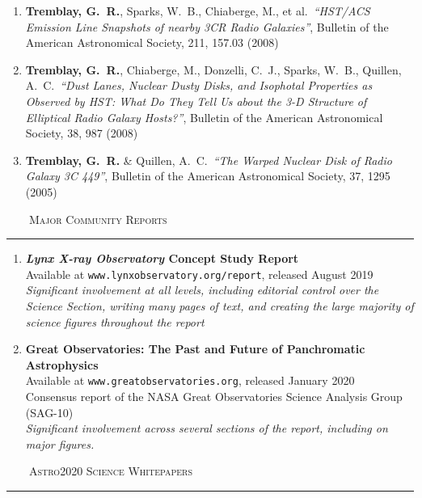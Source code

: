 \documentclass[11pt]{article}
\makeatletter
\def\vhrulefill#1{\leavevmode\leaders\hrule\@height#1\hfill \kern\z@}
\makeatother
\begin{document}
\begin{enumerate}
\item \textbf{Tremblay, G.~R.}, Sparks, W.~B., Chiaberge, M., et al.\ \textit{``HST/ACS Emission Line Snapshots of nearby 3CR Radio Galaxies''},
Bulletin of the American Astronomical Society, 211, 157.03 (2008)



\item \textbf{Tremblay, G.~R.}, Chiaberge, M., Donzelli, C.~J., Sparks, W.~B., Quillen, A.~C.\ \textit{``Dust Lanes, Nuclear Dusty Disks, and Isophotal Properties as Observed by HST: What Do They Tell Us about the 3-D Structure of Elliptical Radio Galaxy Hosts?''},
Bulletin of the American Astronomical Society, 38, 987 (2008)


\item \textbf{Tremblay, G.~R.} \& Quillen, A.~C.\ \textit{``The Warped Nuclear Disk of Radio Galaxy 3C 449''},
Bulletin of the American Astronomical Society, 37, 1295 (2005)

\end{enumerate}


\noindent \textsc{ ~~~~Major Community Reports} \vhrulefill{0.4pt}


\begin{enumerate}

\item \textbf{\textit{Lynx X-ray Observatory} Concept Study Report}\\
Available at \texttt{www.lynxobservatory.org/report}, released August 2019\\
\textit{Significant involvement at all levels, including editorial control over the Science Section,
writing many pages of text, and creating the large majority of science figures throughout the report}

\item \textbf{Great Observatories: The Past and Future of Panchromatic Astrophysics} \\
Available at \texttt{www.greatobservatories.org}, released January 2020\\
Consensus report of the NASA Great Observatories Science Analysis Group (SAG-10)\\
\textit{Significant involvement across several sections of the report, including on major figures.} \\


\end{enumerate}

\noindent \textsc{ ~~~~Astro2020 Science Whitepapers} \vhrulefill{0.4pt}
\end{document}
